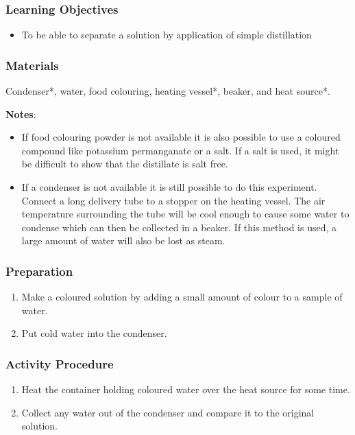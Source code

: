 \subsubsection*{Learning Objectives}
\begin{itemize}
\item{To be able to separate a solution by application of simple distillation}
\end{itemize}

\subsubsection*{Materials}
Condenser*, water, food colouring, heating vessel*, beaker, and heat source*.

\textbf{Notes}:

\begin{itemize}
\item{If food colouring powder is not available it is also possible to use a coloured compound like potassium permanganate or a salt. If a salt is used, it might be difficult to show that the distillate is salt free.}
\item{If a condenser is not available it is still possible to do this experiment. Connect a long delivery tube to a stopper on the heating vessel. The air temperature surrounding the tube will be cool enough to cause some water to condense which can then be collected in a beaker. If this method is used, a large amount of water will also be lost as steam.}
\end{itemize}

\subsubsection*{Preparation}
\begin{enumerate}
\item{Make a coloured solution by adding a small amount of colour to a sample of water.}
\item{Put cold water into the condenser.}
\end{enumerate}

\subsubsection*{Activity Procedure}
\begin{enumerate}
\item{Heat the container holding coloured water over the heat source for some time.}
\item{Collect any water out of the condenser and compare it to the original solution.}
\end{enumerate}

